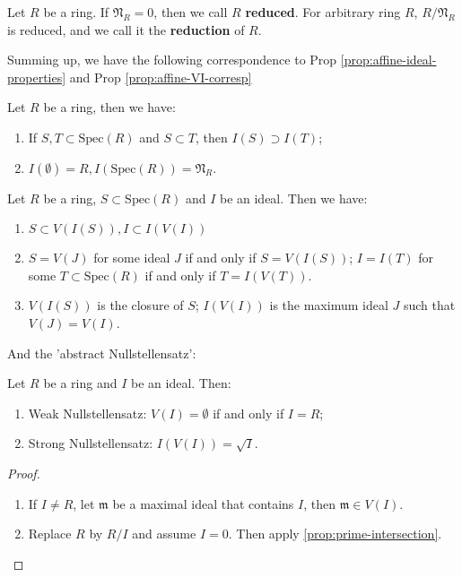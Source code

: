 \documentclass{note-eng}
\begin{document}
\begin{definition}
    Let $R$ be a ring. If $\mathfrak{N}_R = 0$, then we call $R$ \textbf{reduced}. For arbitrary ring $R$, $R / \mathfrak{N}_R$ is reduced, and we call it the \textbf{reduction} of $R$.
\end{definition}

Summing up, we have the following correspondence to Prop \ref{prop:affine-ideal-properties} and Prop \ref{prop:affine-VI-corresp}

\begin{proposition}
    Let $R$ be a ring, then we have:
    \begin{enumerate}
        \item If $S, T \subset \mathrm{Spec}(R)$ and $S \subset T$, then $I(S) \supset I(T)$;
        \item $I(\emptyset) = R, I(\mathrm{Spec}(R)) = \mathfrak{N}_R$.
    \end{enumerate}
\end{proposition}


\begin{proposition}\label{prop:general-closure}
    Let $R$ be a ring, $S \subset \mathrm{Spec}(R)$ and $I$ be an ideal. Then we have:
    \begin{enumerate}
        \item $S \subset V(I(S)), I \subset I(V(I))$
        \item $S = V(J)$ for some ideal $J$ if and only if $S = V(I(S))$; $I = I(T)$ for some $T \subset \mathrm{Spec}(R)$ if and only if $T = I(V(T))$.
        \item $V(I(S))$ is the closure of $S$; $I(V(I))$ is the maximum ideal $J$ such that $V(J) = V(I)$.
    \end{enumerate}
\end{proposition}

And the 'abstract Nullstellensatz':

\begin{proposition}
    Let $R$ be a ring and $I$ be an ideal. Then:
    \begin{enumerate}
        \item Weak Nullstellensatz: $V(I) = \emptyset$ if and only if $I = R$;
        \item Strong Nullstellensatz: $I(V(I)) = \sqrt{I}$.
    \end{enumerate}
\end{proposition}

\begin{proof}
    \begin{enumerate}
        \item If $I \ne R$, let $\mathfrak{m}$ be a maximal ideal that contains $I$, then $\mathfrak{m} \in V(I)$.
        \item Replace $R$ by $R / I$ and assume $I = 0$. Then apply \ref{prop:prime-intersection}.
    \end{enumerate}
\end{proof}
\end{document}

